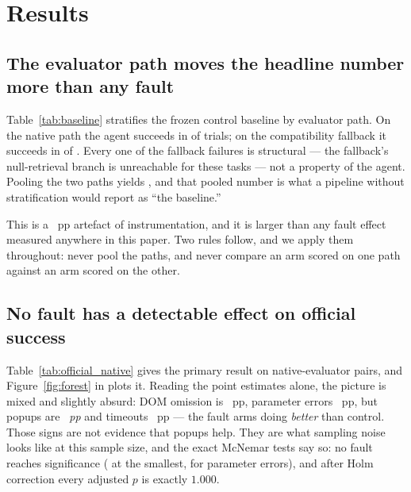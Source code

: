 \section{Results}
\label{sec:results}

\subsection{The evaluator path moves the headline number more than any fault}
\label{sec:res-fallback}

Table~\ref{tab:baseline} stratifies the frozen control baseline by evaluator
path. On the native path the agent succeeds in \BaseNativeRate{} of
\BaseNativeN{} trials; on the compatibility fallback it succeeds in
\BaseFallbackRate{} of \BaseFallbackN{}. Every one of the fallback failures is
structural --- the fallback's null-retrieval branch is unreachable for these
tasks --- not a property of the agent. Pooling the two paths yields
\BasePooledRate{}, and that pooled number is what a pipeline without
stratification would report as ``the baseline.''

This is a \BaselineSwing{}~pp artefact of instrumentation, and it is larger than
any fault effect measured anywhere in this paper. Two rules follow, and we apply
them throughout: never pool the paths, and never compare an arm scored on one
path against an arm scored on the other.



\subsection{No fault has a detectable effect on official success}
\label{sec:res-main}

Table~\ref{tab:official_native} gives the primary result on native-evaluator
pairs, and Figure~\ref{fig:forest} in  plots it. Reading the
point estimates alone, the picture is mixed and slightly
absurd: DOM omission is \ResWebDomMissingDeltaNat{}~pp, parameter errors
\ResAgentParamErrorDeltaNat{}~pp, but popups are
\emph{\ResWebPopupBlockDeltaNat{}~pp} and timeouts
\ResWebTimeoutDeltaNat{}~pp --- the fault arms doing \emph{better} than control.
Those signs are not evidence that popups help. They are what sampling noise looks
like at this sample size, and the exact McNemar tests say so: no fault reaches
significance (\ResAgentParamErrorPNat{} at the smallest, for parameter errors),
and after Holm correction every adjusted $p$ is exactly $1.000$.

